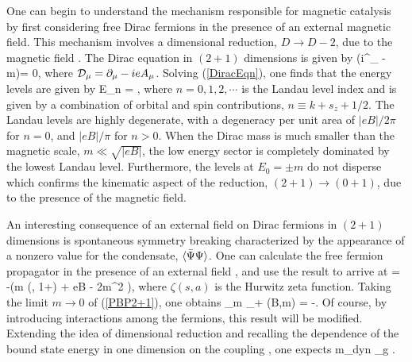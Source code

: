 \documentclass[aps,prd,twocolumn,showpacs,superscriptaddress,groupedaddress]{revtex4}  %
\begin{document}
One can begin to understand the mechanism responsible for magnetic catalysis by first considering free Dirac fermions in the presence of an external magnetic field. This mechanism involves a dimensional 
reduction, $D \to D-2$, due to the magnetic field \cite{Shovkovy}. The Dirac equation in $(2+1)$ dimensions is given by 
\beq
\label{DiracEqn}
(i\gamma^{\mu}\D_{\mu} - m)\Psi = 0,
\eeq
where ${\cal D}_{\mu} = \partial_{\mu} - ieA_{\mu}$.
Solving (\ref{DiracEqn}), one finds that the energy levels are given by 
\beq
\label{DiracEnergyLevels}
E_n = \pm {},
\eeq
where $n=0,1,2,\cdots$ is the Landau level index and is given by a combination of orbital and spin contributions, $n \equiv k + s_z + 1/2$. The Landau levels 
are highly degenerate, with a degeneracy per unit area of $|eB|/2\pi$ for $n=0$, and $|eB|/\pi$ for $n>0$. When the Dirac mass is much smaller than the magnetic scale, $m \ll \sqrt{|eB|}$, the low energy sector 
is completely dominated by the lowest Landau level. Furthermore, the levels at $E_0 = \pm m$ do not disperse which confirms the kinematic aspect of the reduction, $(2+1) \to (0+1)$, due to the presence of the magnetic field.

An interesting consequence of an external field on Dirac fermions in $(2+1)$ dimensions is spontaneous symmetry breaking characterized by the appearance of a nonzero value for the condensate, ${\langle {\bar \Psi} \Psi \rangle}$.
One can calculate the free fermion propagator in the presence of an external field \cite{Schwinger}, and use the result to arrive at \cite{DittrichGies, DittrichReuter}
\beq
\label{PBP2+1}
\vev{\Bpsi \Psi} = -\left(m  \zeta \left(, 1+\right) + eB - 2m^2 \right),
\eeq
where $\zeta(s,a)$ is the Hurwitz zeta function. Taking the limit $m \to 0$ of (\ref{PBP2+1}), one obtains
\beq
\label{PBP2+1Final}
\lim_{m _+} \vev{\Bpsi \Psi}(B,m) = -.
\eeq
Of course, by introducing interactions among the fermions, this result will be modified. Extending the idea of dimensional reduction and recalling the dependence of the bound state energy in one dimension on the coupling \cite{LandauLifschitzQM}, one expects
\beq
\label{DynamicalMass}
m_{dyn} \propto \alpha_g .
\eeq

\end{document}
